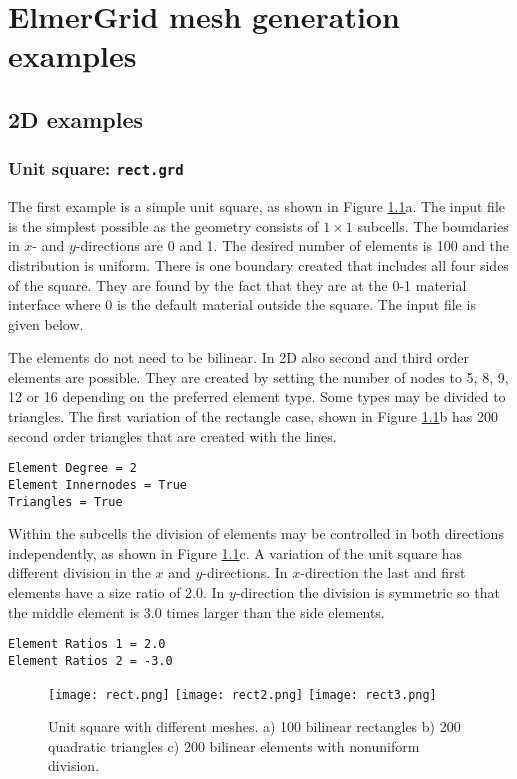 \chapter{ElmerGrid mesh generation examples}


\section{2D examples}

\subsection*{Unit square: \texttt{rect.grd}}

The first example is a simple unit square, as shown in 
Figure \ref{fg:pic1}a.  The input file is the simplest
possible as the geometry consists of $1 \times 1$ subcells.
The boundaries in $x$- and $y$-directions are 0 and 1.
The desired number of elements is 100 and the distribution is uniform.
There is one boundary created that includes all four sides of the 
square. They are found by the fact that they are at the 0-1 material interface
where 0 is the default material outside the square. 
The input file is given below.
%

%
The elements do not need to be bilinear. In 2D also 
second and third order elements are possible. They are created by
setting the number of nodes to 5, 8, 9, 12 or 16 depending on the
preferred element type. Some types may be divided to triangles.
The first variation of the rectangle case, shown in Figure \ref{fg:pic1}b has 200 second order 
triangles that are created with the lines. 
%
\begin{verbatim}
Element Degree = 2
Element Innernodes = True
Triangles = True
\end{verbatim}

\noindent
Within the subcells the division of elements may be controlled in both 
directions independently, as shown in Figure \ref{fg:pic1}c. 
A variation of the unit square has different
division in the $x$ and $y$-directions. In $x$-direction the
last and first elements have a size ratio of 2.0.
In $y$-direction the division is symmetric so that the middle element
is 3.0 times larger than the side elements.

\begin{verbatim}
Element Ratios 1 = 2.0
Element Ratios 2 = -3.0
\end{verbatim}

\begin{figure}[H]
\centering
\texttt{[image: rect.png]}
\texttt{[image: rect2.png]}
\texttt{[image: rect3.png]}
\caption{Unit square with different meshes. a) 100 bilinear rectangles
b) 200 quadratic triangles c) 200 bilinear elements with nonuniform 
division.}
\label{fg:pic1}
\end{figure}

